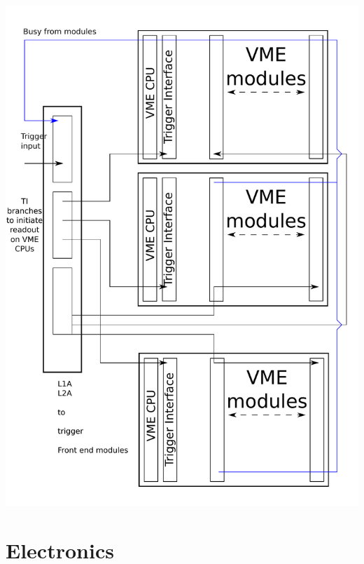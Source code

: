 \documentclass{article}
\begin{document}
\includegraphics[scale=0.55]{figs/TS.pdf}\\


\section{Electronics}
\end{document}
